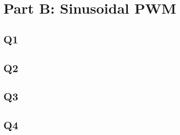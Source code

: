 \section{Part B: Sinusoidal PWM}
\subsection{Q1}

\subsection{Q2}

\subsection{Q3}

\subsection{Q4}
